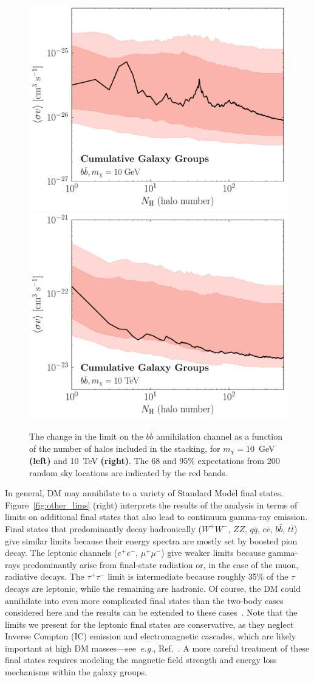 \begin{figure}[b]
  \centering
	\includegraphics[width=.45\textwidth]{ch-clusters/plots/elephant10.pdf} 
	\includegraphics[width=.45\textwidth]{ch-clusters/plots/elephant10000.pdf} 
  \caption{The change in the limit on the $b\bar{b}$ annihilation channel as a function of the number of halos included in the stacking, for $m_\chi= 10$~GeV \textbf{(left)} and 10~TeV \textbf{(right)}. The 68 and 95\% expectations from 200 random sky locations are indicated by the red bands.}
  \label{fig:moreelephants}
\end{figure}

In general, DM may annihilate to a variety of Standard Model final states.  Figure~\ref{fig:other_lims} (right) interprets the results of the analysis in terms of limits on additional final states that also lead to continuum gamma-ray emission.  Final states that predominantly decay hadronically  ($W^+ W^-$, $ZZ$, $q \bar{q}$, $c \bar c$, $b \bar b$, $t \bar t$) give similar limits because their energy spectra are mostly set by boosted pion decay.  The leptonic channels ($e^+ e^-$, $\mu^+ \mu^-$) give weaker limits because gamma-rays predominantly arise from final-state radiation or, in the case of the muon, radiative decays.  The $\tau^+ \tau^-$ limit is intermediate because roughly 35\% of the $\tau$ decays are leptonic, while the remaining are hadronic.   Of course, the DM could annihilate into even more complicated final states than the two-body cases considered here and the results can be extended to these cases~\cite{Elor:2015tva,Elor:2015bho}.  Note that the limits we present for the leptonic final states are conservative, as they neglect Inverse Compton (IC) emission and electromagnetic cascades, which are likely important at high DM masses---see~\emph{e.g.}, Ref.~\cite{Cirelli:2009dv, Murase:2012xs}.  A more careful treatment of these final states requires modeling the magnetic field strength and energy loss mechanisms within the galaxy groups. 
\vspace{0.1in}

